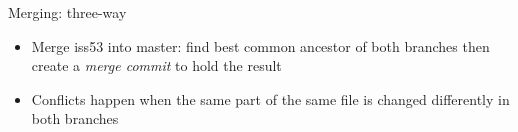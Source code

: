 \documentclass{beamer}
\begin{document}
\begin{frame}{Merging: three-way}
  \begin{center}
  \end{center}
  \begin{itemize}
  \item Merge iss53 into master: find best common ancestor of both branches then create a \emph{merge commit} to hold the result
  \item Conflicts happen when the same part of the same file is changed differently in both branches
  \end{itemize}
\end{frame}
\end{document}
